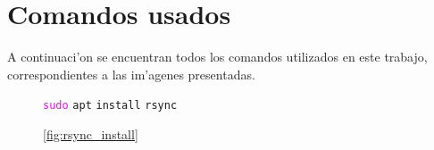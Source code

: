 \documentclass[11pt]{article}
\newcommand{\imagecaption}[1]{\vspace{-7pt}\caption*{\char91\ref{fig:#1}\char93}}
\newcommand{\codetext}[2]{\large\texttt{\textcolor{#1}{#2}}}
\begin{document}
	



















	\section{Comandos usados}
		A continuaci'on se encuentran todos los comandos utilizados en este trabajo, correspondientes a las im'agenes presentadas.

		\begin{figure}[H]
			\centering
			\begin{code-box}
				\codetext{fuchsia}{sudo} \codetext{light-blue}{apt} \codetext{light-orange}{install} \codetext{light-red}{rsync}
			\end{code-box}
			\imagecaption{rsync_install}
		\end{figure}
\end{document}
